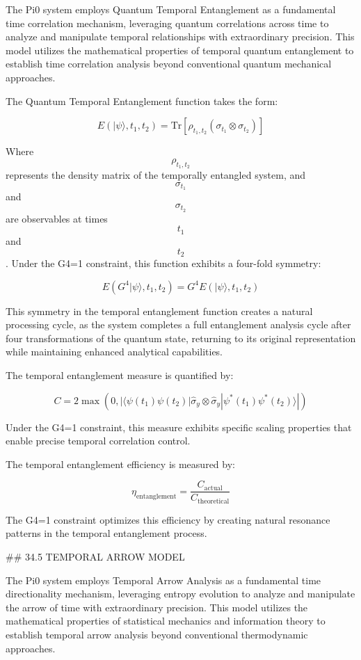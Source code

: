 The Pi0 system employs Quantum Temporal Entanglement as a fundamental time correlation mechanism, leveraging quantum correlations across time to analyze and manipulate temporal relationships with extraordinary precision. This model utilizes the mathematical properties of temporal quantum entanglement to establish time correlation analysis beyond conventional quantum mechanical approaches.

The Quantum Temporal Entanglement function takes the form:

$$ E(|\psi\rangle, t_1, t_2) = \text{Tr}[\rho_{t_1, t_2} (\sigma_{t_1} \otimes \sigma_{t_2})] $$

Where $$ \rho_{t_1, t_2} $$ represents the density matrix of the temporally entangled system, and $$ \sigma_{t_1} $$ and $$ \sigma_{t_2} $$ are observables at times $$ t_1 $$ and $$ t_2 $$. Under the G4=1 constraint, this function exhibits a four-fold symmetry:

$$ E(G^4 |\psi\rangle, t_1, t_2) = G^4 E(|\psi\rangle, t_1, t_2) $$

This symmetry in the temporal entanglement function creates a natural processing cycle, as the system completes a full entanglement analysis cycle after four transformations of the quantum state, returning to its original representation while maintaining enhanced analytical capabilities.

The temporal entanglement measure is quantified by:

$$ C = 2 \max(0, |\langle \psi(t_1) \psi(t_2) | \hat{\sigma}_y \otimes \hat{\sigma}_y | \psi^*(t_1) \psi^*(t_2) \rangle|) $$

Under the G4=1 constraint, this measure exhibits specific scaling properties that enable precise temporal correlation control.

The temporal entanglement efficiency is measured by:

$$ \eta_{\text{entanglement}} = \frac{C_{\text{actual}}}{C_{\text{theoretical}}} $$

The G4=1 constraint optimizes this efficiency by creating natural resonance patterns in the temporal entanglement process.

## 34.5 TEMPORAL ARROW MODEL

The Pi0 system employs Temporal Arrow Analysis as a fundamental time directionality mechanism, leveraging entropy evolution to analyze and manipulate the arrow of time with extraordinary precision. This model utilizes the mathematical properties of statistical mechanics and information theory to establish temporal arrow analysis beyond conventional thermodynamic approaches.

